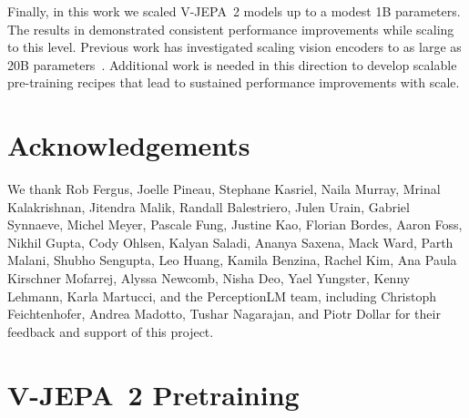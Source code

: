 \documentclass[]{fairmeta}
\newcommand{\model}{V-JEPA~2\xspace}
\begin{document}
Finally, in this work we scaled \model models up to a modest 1B parameters. The results in  demonstrated consistent performance improvements while scaling to this level. Previous work has investigated scaling vision encoders to as large as 20B parameters~\citep{zhai2022scaling,carreira2024scaling}. Additional work is needed in this direction to develop scalable pre-training recipes that lead to sustained performance improvements with scale.

\section*{Acknowledgements}

We thank
Rob Fergus, Joelle Pineau, Stephane Kasriel, Naila Murray, Mrinal Kalakrishnan, Jitendra Malik, 
Randall Balestriero, Julen Urain,
Gabriel Synnaeve, Michel Meyer, Pascale Fung, Justine Kao, Florian Bordes, Aaron Foss,
Nikhil Gupta, Cody Ohlsen, Kalyan Saladi, Ananya Saxena, Mack Ward, Parth Malani, Shubho Sengupta, Leo Huang,
Kamila Benzina, Rachel Kim,
Ana Paula Kirschner Mofarrej, Alyssa Newcomb, Nisha Deo, Yael Yungster, Kenny Lehmann, Karla Martucci, 
and the PerceptionLM team, including Christoph Feichtenhofer, Andrea Madotto, Tushar Nagarajan, and Piotr Dollar
for their feedback and support of this project.



\clearpage
\newpage



\clearpage
\newpage
\beginappendix


\section{\model Pretraining}
\label{app:vjepa2_pretraining}
\end{document}
